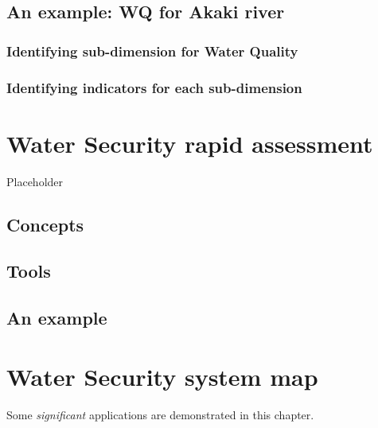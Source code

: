 \documentclass[
]{book}
\begin{document}
\hypertarget{an-example-wq-for-akaki-river}{%
\section{An example: WQ for Akaki river}\label{an-example-wq-for-akaki-river}}

\hypertarget{identifying-sub-dimension-for-water-quality}{%
\subsection{Identifying sub-dimension for Water Quality}\label{identifying-sub-dimension-for-water-quality}}

\hypertarget{identifying-indicators-for-each-sub-dimension}{%
\subsection{Identifying indicators for each sub-dimension}\label{identifying-indicators-for-each-sub-dimension}}

\hypertarget{water-security-rapid-assessment}{%
\chapter{Water Security rapid assessment}\label{water-security-rapid-assessment}}

Placeholder

\hypertarget{concepts-2}{%
\section{Concepts}\label{concepts-2}}

\hypertarget{tools-2}{%
\section{Tools}\label{tools-2}}

\hypertarget{an-example-1}{%
\section{An example}\label{an-example-1}}

\hypertarget{water-security-system-map}{%
\chapter{Water Security system map}\label{water-security-system-map}}

Some \emph{significant} applications are demonstrated in this chapter.
\end{document}
